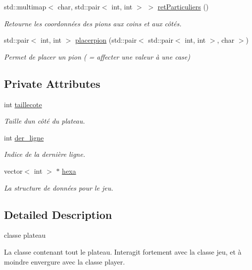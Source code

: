 \begin{DoxyCompactItemize}
std\+::multimap$<$ char, std\+::pair$<$ int, int $>$ $>$ \hyperlink{classplateau_a1ab855651bf0107e7af3867873d54389}{ret\+Particuliers} ()
\begin{DoxyCompactList}\small\item\em Retourne les coordonnées des pions aux coins et aux côtés. \end{DoxyCompactList}\item 
std\+::pair$<$ int, int $>$ \hyperlink{classplateau_a973c415e1427c7fa427d2d8da95f5cff}{placerpion} (std\+::pair$<$ std\+::pair$<$ int, int $>$, char $>$)
\begin{DoxyCompactList}\small\item\em Permet de placer un pion ( = affecter une valeur à une case) \end{DoxyCompactList}\end{DoxyCompactItemize}
\subsection*{Private Attributes}
\begin{DoxyCompactItemize}
\item 
int \hyperlink{classplateau_a3a22c0369525080629eba2ac2edab03e}{taillecote}
\begin{DoxyCompactList}\small\item\em Taille d\textquotesingle{}un côté du plateau. \end{DoxyCompactList}\item 
int \hyperlink{classplateau_a3ed9526208bf28f0063bdf7c0efb9391}{der\+\_\+ligne}
\begin{DoxyCompactList}\small\item\em Indice de la dernière ligne. \end{DoxyCompactList}\item 
vector$<$ int $>$ $\ast$ \hyperlink{classplateau_a1cf99c526864d850ffe97f5507ab1bcb}{hexa}
\begin{DoxyCompactList}\small\item\em La structure de données pour le jeu. \end{DoxyCompactList}\end{DoxyCompactItemize}


\subsection{Detailed Description}
classe plateau 

La classe contenant tout le plateau. Interagit fortement avec la classe jeu, et à moindre envergure avec la classe player.

